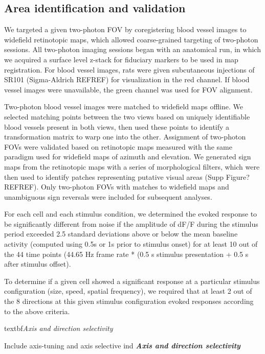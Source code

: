 \subsection{Area identification and validation}
We targeted a given two-photon FOV by coregistering blood vessel images to widefield retinotopic maps, which allowed coarse-grained targeting of two-photon sessions. All two-photon imaging sessions began with an anatomical run, in which we acquired a surface level z-stack for fiduciary markers to be used in map registration. For blood vessel images, rats were given subcutaneous injections of SR101 (Sigma-Aldrich REFREF) for visualization in the red channel. If blood vessel images were unavailable, the green channel was used for FOV alignment. 

Two-photon blood vessel images were matched to widefield maps offline. We selected matching points between the two views based on uniquely identifiable blood vessels present in both views, then used these points to identify a transformation matrix to warp one into the other. Assignment of two-photon FOVs were validated based on retinotopic maps measured with the same paradigm used for widefield maps of azimuth and elevation. We generated sign maps from the retinotopic maps with a series of morphological filters\cite{Marshel2011, Garrett2014, Zhuang2017}, which were then used to identify patches representing putative visual areas (Supp Figure? REFREF). Only two-photon FOVs with matches to widefield maps and unambiguous sign reversals were included for subsequent analyses. 


For each cell and each stimulus condition, we determined the evoked response to be significantly different from noise if the amplitude of dF/F during the stimulus period exceeded 2.5 standard deviations above or below the mean baseline activity (computed using 0.5s or 1s prior to stimulus onset) for at least 10 out of the 44 time points (44.65 Hz frame rate * (0.5 s stimulus presentation + 0.5 s after stimulus offset).

To determine if a given cell showed a significant response at a particular stimulus configuration (size, speed, spatial frequency), we required that at least 2 out of the 8 directions at this given stimulus configuration evoked responses according to the above criteria. 

textbf{\textit{Axis and direction selectivity}}

Include axis-tuning and axis selective ind
\textbf{\textit{Axis and direction selectivity}}

